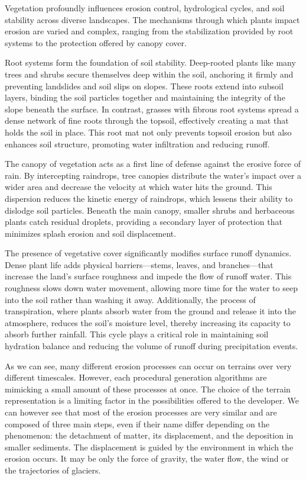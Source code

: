 Vegetation profoundly influences erosion control, hydrological cycles, and soil stability across diverse landscapes. The mechanisms through which plants impact erosion are varied and complex, ranging from the stabilization provided by root systems to the protection offered by canopy cover.

Root systems form the foundation of soil stability. Deep-rooted plants like many trees and shrubs secure themselves deep within the soil, anchoring it firmly and preventing landslides and soil slips on slopes. These roots extend into subsoil layers, binding the soil particles together and maintaining the integrity of the slope beneath the surface. In contrast, grasses with fibrous root systems spread a dense network of fine roots through the topsoil, effectively creating a mat that holds the soil in place. This root mat not only prevents topsoil erosion but also enhances soil structure, promoting water infiltration and reducing runoff.

The canopy of vegetation acts as a first line of defense against the erosive force of rain. By intercepting raindrops, tree canopies distribute the water's impact over a wider area and decrease the velocity at which water hits the ground. This dispersion reduces the kinetic energy of raindrops, which lessens their ability to dislodge soil particles. Beneath the main canopy, smaller shrubs and herbaceous plants catch residual droplets, providing a secondary layer of protection that minimizes splash erosion and soil displacement.

The presence of vegetative cover significantly modifies surface runoff dynamics. Dense plant life adds physical barriers—stems, leaves, and branches—that increase the land's surface roughness and impede the flow of runoff water. This roughness slows down water movement, allowing more time for the water to seep into the soil rather than washing it away. Additionally, the process of transpiration, where plants absorb water from the ground and release it into the atmosphere, reduces the soil's moisture level, thereby increasing its capacity to absorb further rainfall. This cycle plays a critical role in maintaining soil hydration balance and reducing the volume of runoff during precipitation events.

\midConclusion

As we can see, many different erosion processes can occur on terrains over very different timescales. However, each procedural generation algorithms are mimicking a small amount of these processes at once. The choice of the terrain representation is a limiting factor in the possibilities offered to the developer. We can however see that most of the erosion processes are very similar and are composed of three main steps, even if their name differ depending on the phenomenon: the detachment of matter, its displacement, and the deposition in smaller sediments. The displacement is guided by the environment in which the erosion occurs. It may be only the force of gravity, the water flow, the wind or the trajectories of glaciers. 



